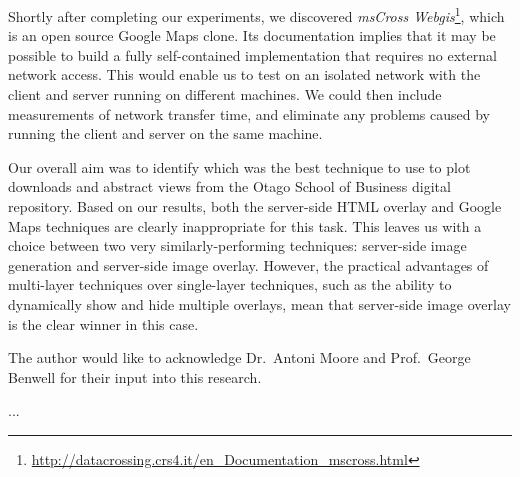 \documentclass[acmnow]{acmtrans2m}
\begin{document}
Shortly after completing our experiments, we discovered \emph{msCross
Webgis}\footnote{\url{http://datacrossing.crs4.it/en_Documentation_mscross.html}},
which is an open source Google Maps clone. Its documentation implies
that it may be possible to build a fully self-contained implementation
that requires no external network access. This would enable us to test
on an isolated network with the client and server running on different
machines. We could then include measurements of network transfer time,
and eliminate any problems caused by running the client and server on
the same machine.

Our overall aim was to identify which was the best technique to use to
plot downloads and abstract views from the Otago School of Business
digital repository. Based on our results, both the server-side HTML
overlay and Google Maps techniques are clearly inappropriate for this
task. This leaves us with a choice between two very similarly-performing
techniques: server-side image generation and server-side image overlay.
However, the practical advantages of multi-layer techniques over
single-layer techniques, such as the ability to dynamically show and
hide multiple overlays, mean that server-side image overlay is the clear
winner in this case.


\begin{acks}
The author would like to acknowledge Dr.\ Antoni Moore and Prof.\ George
Benwell for their input into this research.
\end{acks}





\begin{received}
...
\end{received}
\end{document}
